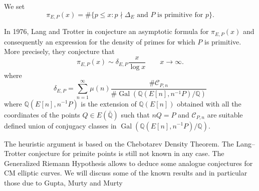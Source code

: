 \documentclass[a4paper,10pt]{article}
\newcommand{\F}{\mathbb{F}}
\newcommand{\Q}{\mathbb{Q}}
\begin{document}
We set $$\pi_{E,P}(x)=\#\{p\le x: p\nmid\Delta_E\text{ and } P\text{ is primitive for } p\}.$$

In 1976, Lang and Trotter in \cite{LT1} conjecture an asymptotic formula for $\pi_{E,P}(x)$ and consequently 
an expression for the density of primes for which $P$ is primitive.
More precisely, they conjecture that
$$\pi_{E,P}(x)\sim \delta_{E,P}\frac x{\log x}\qquad x\rightarrow\infty.$$
where 
$$\delta_{E,P}=\sum_{n=1}^\infty\mu(n)\frac{\#\mathcal C_{P,n}}{\#\operatorname{Gal}(\Q(E[n],n^{-1}P)/\Q)}$$
where $\Q(E[n],n^{-1}P)$ is the extension of $\Q(E[n])$ obtained with all the coordinates of the points
$Q\in E(\bar{\Q})$ such that $nQ=P$ and $\mathcal C_{P,n}$ are suitable defined union of conjugacy classes in 
$\operatorname{Gal}(\Q(E[n],n^{-1}P)/\Q)$.

The heuristic argument is based on the Chebotarev Density Theorem.
%    
%   
%    
   The Lang--Trotter conjecture for primite points is still not known in any case. The Generalized Riemann Hypothesis allows to deduce some analogue conjectures 
   for CM elliptic curves. We will discuss some of the known results and in particular those due to Gupta, Murty and Murty \cite{GM}
   
\end{document}
